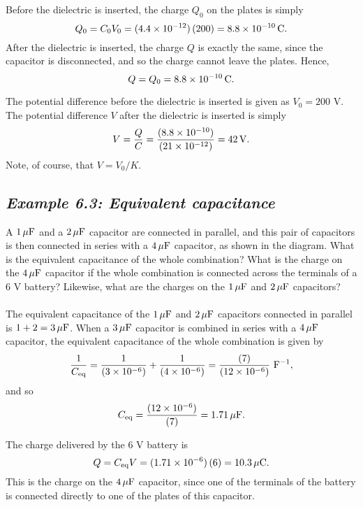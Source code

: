 Before the dielectric is inserted, the charge $Q_0$ on the plates is
simply
$$
Q_0 = C_0 V_0 = (4.4\times 10^{-12})\,(200) = 8.8\times 10^{-10} \,{\rm C}.
$$
After the dielectric is inserted, the charge  $Q$ is exactly the same, since the
capacitor is disconnected, and so the charge cannot leave the plates.
Hence,
$$
Q=Q_0 = 8.8\times 10^{-10} \,{\rm C}.
$$

The potential difference before the dielectric is inserted is given as
$V_0=200$ V. The potential difference $V$ after the dielectric is
inserted is simply
$$
V = \frac{Q}{C} =\frac{(8.8\times 10^{-10})}{(21\times 10^{-12})} = 42\, {\rm V}.
$$
Note, of course, that $V=V_0/K$. 

\subsection*{\em Example 6.3: Equivalent capacitance}
\begin{figure*}[h]
\epsfysize=2in
\centerline{}
\end{figure*}
A $1\,\mu{\rm F}$ and a $2\,\mu{\rm F}$ capacitor are connected in parallel, and this pair of
capacitors is then connected in series with a $4\,\mu{\rm F}$ capacitor, as
shown in the diagram.
What is the equivalent capacitance of the whole combination?
What is the charge on the $4\,\mu{\rm F}$ capacitor if 
the whole combination is connected across the terminals of
a $6$ V battery? Likewise, what are the charges on the 
$1\,\mu{\rm F}$ and $2\,\mu{\rm F}$ capacitors?\\
~\\
 The equivalent capacitance of the   $1\,\mu{\rm F}$ and $2\,\mu{\rm F}$
capacitors connected in parallel is $1+2= 3\,\mu{\rm F}$.
When a $3\,\mu{\rm F}$ capacitor  is combined in series with a $4\,{\mu}{\rm F}$ capacitor,
the equivalent capacitance of the whole combination is given by
$$
\frac{1}{C_{\rm eq}} = \frac{1}{(3\times 10^{-6})} + \frac{1}{(4\times 10^{-6})} = \frac{(7)}{(12\times 10^{-6})}\,\,{\rm F}^{-1},
$$
and so
$$
C_{\rm eq} = \frac{(12\times 10^{-6})}{(7)} = 1.71\,\mu{\rm F}.
$$

The charge delivered by the $6$ V battery is 
$$
Q = C_{\rm eq} V = (1.71\times 10^{-6})\,(6) = 10.3\,\mu{\rm C}.
$$
This is the charge on the $4\,\mu{\rm F}$ capacitor, since one of the terminals
of the battery is connected directly to one of the plates of this capacitor.

